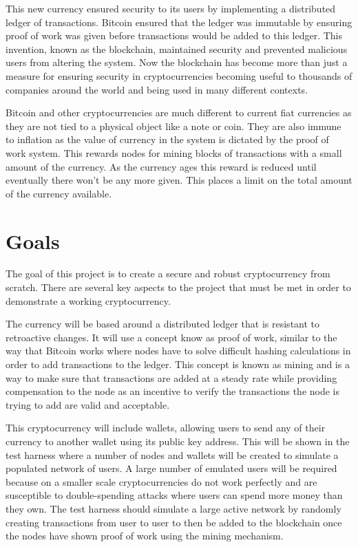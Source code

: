 \documentclass{l4proj}
\begin{document}
This new currency ensured security to its users by implementing a distributed ledger of transactions. Bitcoin
ensured that the ledger was immutable by ensuring proof of work was given before transactions would be
added to this ledger. This invention, known as the blockchain, maintained security and prevented malicious
users from altering the system. Now the blockchain has become more than just a measure for ensuring security
in cryptocurrencies becoming useful to thousands of companies around the world and being used
in many different contexts.

Bitcoin and other cryptocurrencies are much different to current fiat currencies as they are not tied to a physical
object like a note or coin. They are also immune to inflation as the value of currency in the system is dictated
by the proof of work system. This rewards nodes for mining blocks of transactions with a small amount of the 
currency. As the currency ages this reward is reduced until eventually there won't be any more given. This places
a limit on the total amount of the currency available. 

\section{Goals}
The goal of this project is to create a secure and robust cryptocurrency from scratch. There are several key aspects
to the project that must be met in order to demonstrate a working cryptocurrency.

The currency will be based around
a distributed ledger that is resistant to retroactive changes. It will use a concept know as proof of work,
similar to the way that Bitcoin works where nodes have to solve difficult hashing calculations in order
to add transactions to the ledger. This concept is known as mining and is a way to make sure that transactions
are added at a steady rate while providing compensation to the node as an incentive to verify the transactions the node
is trying to add are valid and acceptable.

This cryptocurrency will include wallets, allowing users to send any of their currency to another
wallet using its public key address. This will be shown in the test harness where a number of nodes and wallets 
will be created to simulate a populated network of users. A large number of emulated users will be required because on
a smaller scale cryptocurrencies do not work perfectly and are susceptible to double-spending attacks where users
can spend more money than they own. The test harness should simulate a large active network by randomly creating
transactions from user to user to then be added to the blockchain once the nodes have shown proof of work using 
the mining mechanism.
\end{document}
